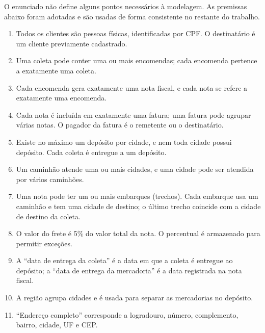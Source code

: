 O enunciado não define alguns pontos necessários à modelagem. As premissas abaixo foram adotadas e são usadas de forma consistente no restante do trabalho.
\begin{enumerate}[label=P\arabic*.,leftmargin=2.1em]
  \item Todos os clientes são pessoas físicas, identificadas por CPF. O destinatário é um cliente previamente cadastrado.
  \item Uma coleta pode conter uma ou mais encomendas; cada encomenda pertence a exatamente uma coleta.
  \item Cada encomenda gera exatamente uma nota fiscal, e cada nota se refere a exatamente uma encomenda.
  \item Cada nota é incluída em exatamente uma fatura; uma fatura pode agrupar várias notas. O pagador da fatura é o remetente ou o destinatário.
  \item Existe no máximo um depósito por cidade, e nem toda cidade possui depósito. Cada coleta é entregue a um depósito.
  \item Um caminhão atende uma ou mais cidades, e uma cidade pode ser atendida por vários caminhões.
  \item Uma nota pode ter um ou mais embarques (trechos). Cada embarque usa um caminhão e tem uma cidade de destino; o último trecho coincide com a cidade de destino da coleta.
  \item O valor do frete é 5\% do valor total da nota. O percentual é armazenado para permitir exceções.
  \item A ``data de entrega da coleta'' é a data em que a coleta é entregue ao depósito; a ``data de entrega da mercadoria'' é a data registrada na nota fiscal.
  \item A região agrupa cidades e é usada para separar as mercadorias no depósito.
  \item ``Endereço completo'' corresponde a logradouro, número, complemento, bairro, cidade, UF e CEP.
\end{enumerate}

